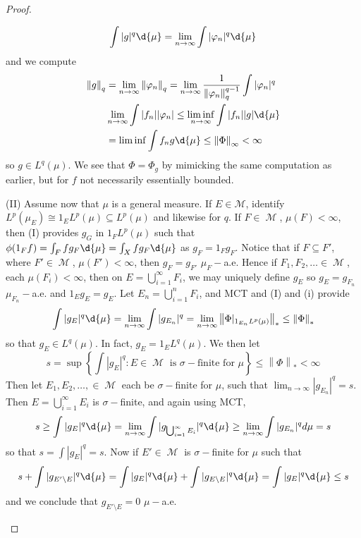 \documentclass[11pt, a4paper]{memoir}
\newcommand{\norm}[1]{\ensuremath{\left\lVert#1\right\rVert}}
\theoremstyle{change}
\theoremstyle{plain}
\theoremstyle{nonumberplain}
\newtheorem{proof}{Proof}
\DeclareMathOperator{\M}{{\mathcal{M}}}
\begin{document}
\begin{proof}
\begin{enumerate}[label=(\roman*)]
\begin{equation*}
                \int|g|^q\d{\mu}=\lim_{n\to\infty}\int|\varphi_n|^q\d{\mu}
            \end{equation*}
            and we compute
            \begin{align*}
                \norm{g}_q&=\lim_{n\to\infty}\norm{\varphi_n}_q=\lim_{n\to\infty}\frac{1}{\norm{\varphi_n}_q^{q-1}}\int|\varphi_n|^q\\
                          &\lim_{n\to\infty}\int|f_n||\varphi_n|\leq\liminf_{n\to\infty}\int|f_n||g|\d{\mu}\\
                          &= \liminf\int f_ng\d{\mu}\leq\norm{\Phi}_\infty<\infty
            \end{align*}
            so $g\in L^q(\mu)$.
            We see that $\Phi=\Phi_g$ by mimicking the same computation as earlier, but for $f$ not necessarily essentially bounded.

            (II) Assume now that $\mu$ is a general measure.
            If $E\in\mathcal{M}$, identify $L^p(\mu_E)\cong 1_EL^p(\mu)\subseteq L^p(\mu)$ and likewise for $q$.
            If $F\in\M$, $\mu(F)<\infty$, then (I) provides $g_G$ in $1_FL^p(\mu)$ such that $\phi(1_Ff)=\int_F fg_F\d{\mu}=\int_X fg_F\d{\mu}$ as $g_F=1_Fg_F$.
            Notice that if $F\subseteq F'$, where $F'\in\M$, $\mu(F')<\infty$, then $g_F=g_{F'}$ $\mu_F-$a.e.
            Hence if $F_1,F_2,\ldots\in\M$, each $\mu(F_i)<\infty$, then on $E=\bigcup_{i=1}^\infty F_i$, we may uniquely define $g_E$ so $g_E=g_{F_n}$ $\mu_{F_n}-$a.e. and $1_Eg_E=g_E$.
            Let $E_n=\bigcup_{i=1}^n F_i$, and MCT and (I) and (i) provide
            \begin{equation*}
                \int|g_E|^q\d{\mu}=\lim_{n\to\infty}\int|g_{E_n}|^q=\lim_{n\to\infty}\norm{\Phi|_{1_{E_n}L^p(\mu)}}_*\leq\norm{\Phi}_*
            \end{equation*}
            so that $g_E\in L^q(\mu)$.
            In fact, $g_E=1_EL^q(\mu)$.
            We then let
            \begin{equation*}
                s=\sup\left\{\int|g_E|^q:E\in\M\text{ is $\sigma-$finite for $\mu$}\right\}\leq\norm{\Phi}_*<\infty
            \end{equation*}
            Then let $E_1,E_2,\ldots,\in\M$ each be $\sigma-$finite for $\mu$, such that $\lim_{n\to\infty}|g_{E_n}|^q=s$.
            Then $E=\bigcup_{i=1}^\infty E_i$ is $\sigma-$finite, and again using MCT,
            \begin{equation*}
                s\geq\int|g_E|^q\d{\mu}=\lim_{n\to\infty}\int|g_{\bigcup_{i=1}^\infty E_i}|^q\d{\mu}\geq\lim_{n\to\infty}\int|g_{E_n}|^qd{\mu}=s
            \end{equation*}
            so that $s=\int|g_E|^q=s$.
            Now if $E'\in\M$ is $\sigma-$finite for $\mu$ such that
            \begin{equation*}
                s+\int|g_{E'\setminus E}|^q\d{\mu}=\int|g_E|^q\d{\mu}+\int|g_{E\setminus E}|^q\d{\mu}=\int|g_E|^q\d{\mu}\leq s
            \end{equation*}
            and we conclude that $g_{E'\setminus E}=0$ $\mu-$a.e.


\end{enumerate}
\end{proof}
\end{document}
